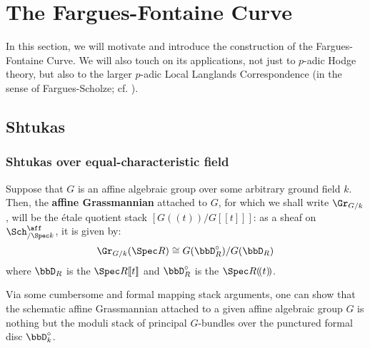\section{The Fargues-Fontaine Curve}
        In this section, we will motivate and introduce the construction of the Fargues-Fontaine Curve. We will also touch on its applications, not just to $p$-adic Hodge theory, but also to the larger $p$-adic Local Langlands Correspondence (in the sense of Fargues-Scholze; cf. \cite{fargues_scholze_geometrization_of_local_langlands}).
    
        \subsection{Shtukas}
            \subsubsection{Shtukas over equal-characteristic field}
                \begin{definition} \label{def: schematic_grassmannian}
                    Suppose that $G$ is an affine algebraic group over some arbitrary ground field $k$. Then, the \textbf{affine Grassmannian} attached to $G$, for which we shall write $\Gr_{G/k}$, will be the \'etale quotient stack $\left[G(\!(t)\!)/G[\![t]\!]\right]$: as a sheaf on $\Sch^{\aff}_{/\Spec k}$, it is given by:
                        $$\Gr_{G/k}(\Spec R) \cong G(\bbD^{\circ}_R)/G(\bbD_R)$$
                    where $\bbD_R$ is the  $\Spec R[\![t]\!]$ and $\bbD^{\circ}_R$ is the  $\Spec R(\!(t)\!)$.
                \end{definition}
                \begin{remark}
                    Via some cumbersome and formal mapping stack arguments, one can show that the schematic affine Grassmannian attached to a given affine algebraic group $G$ is nothing but the moduli stack of principal $G$-bundles over the punctured formal disc $\bbD_k^{\circ}$. 
                \end{remark}
                    
